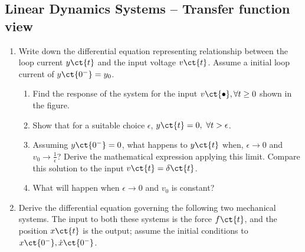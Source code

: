 \subsection*{Linear Dynamics Systems -- Transfer function view}
\begin{enumerate}[resume]
    \item Write down the differential equation representing relationship between the loop current $y\ct{t}$ and the input voltage $v\ct{t}$. Assume a initial loop current of $y\ct{0^-} = y_0$.
    \begin{center}
    \end{center}
    \begin{enumerate}
        \item Find the response of the system for the input $v\ct{\bullet}, \forall t \geq 0$ shown in the figure.
        \item Show that for a suitable choice $\epsilon$, $y\ct{t} = 0, \,\, \forall t > \epsilon$.
        \item Assuming $y\ct{0^-} = 0$, what happens to $y\ct{t}$ when, $\epsilon \to 0$ and $v_0 \to \frac{1}{\epsilon}$? Derive the mathematical expression applying this limit. Compare this solution to the input $v\ct{t} = \delta\ct{t}$.
        \item What will happen when $\epsilon \to 0$ and $v_0$ is constant?  
    \end{enumerate}

    \item Derive the differential equation governing the following two mechanical systems. The input to both these systems is the force $f\ct{t}$, and the position $x\ct{t}$ is the output; assume the initial conditions to $x\ct{0^-}, \dot{x}\ct{0^-}$.


\end{enumerate}
